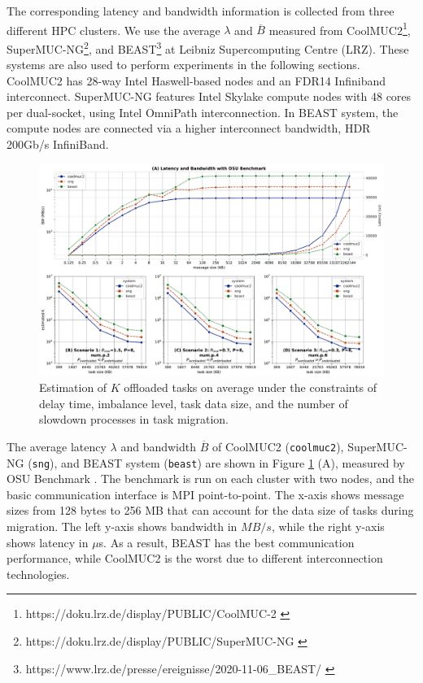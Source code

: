 The corresponding latency and bandwidth information is collected from three different HPC clusters. We use the average $\lambda$ and $\overline{B}$ measured from CoolMUC2\footnote{https://doku.lrz.de/display/PUBLIC/CoolMUC-2 \label{footnote:lrz_coolmuc}}, SuperMUC-NG\footnote{https://doku.lrz.de/display/PUBLIC/SuperMUC-NG \label{footnote:lrz_sng}}, and BEAST\footnote{https://www.lrz.de/presse/ereignisse/2020-11-06\_BEAST/ \label{footnote:lrz_beast}} at Leibniz Supercomputing Centre (LRZ). These systems are also used to perform experiments in the following sections. CoolMUC2 has 28-way Intel Haswell-based nodes and an FDR14 Infiniband interconnect. SuperMUC-NG features Intel Skylake compute nodes with 48 cores per dual-socket, using Intel OmniPath interconnection. In BEAST system, the compute nodes are connected via a higher interconnect bandwidth, HDR 200Gb/s InfiniBand.\\

\begin{figure}[t]
  \centering
  \includegraphics[scale=0.4375]{./pictures/perf_analysis_model/perf_k_offload_tasks_vs_delay_avg_bound.pdf}
	\caption{Estimation of $K$ offloaded tasks on average under the constraints of delay time, imbalance level, task data size, and the number of slowdown processes in task migration.}
	\label{fig:k_estimation_avg_bound}
\end{figure}

The average latency $\lambda$ and bandwidth $\overline{B}$ of CoolMUC2 (\texttt{coolmuc2}), SuperMUC-NG (\texttt{sng}), and BEAST system (\texttt{beast}) are shown in Figure \ref{fig:k_estimation_avg_bound} (A), measured by OSU Benchmark \cite{panda2021mvapich}. The benchmark is run on each cluster with two nodes, and the basic communication interface is MPI point-to-point. The x-axis shows message sizes from 128 bytes to 256 MB that can account for the data size of tasks during migration. The left y-axis shows bandwidth in $MB/s$, while the right y-axis shows latency in $\mu$s. As a result, BEAST has the best communication performance, while CoolMUC2 is the worst due to different interconnection technologies. \\

